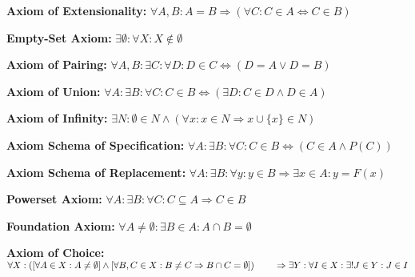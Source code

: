 \begin{description}
	\item \textbf{Axiom of Extensionality:} \quad $\forall A, B: A = B \Rightarrow (\forall C: C \in A \Leftrightarrow C \in B)$
	\item \textbf{Empty-Set Axiom:} \quad $\exists \emptyset : \forall X: X \notin \emptyset$
	\item \textbf{Axiom of Pairing:} \quad $\forall A, B: \exists C: \forall D: D \in C \Leftrightarrow (D = A \lor D = B)$
	\item \textbf{Axiom of Union:} \quad $\forall A: \exists B: \forall C: C \in B \Leftrightarrow (\exists D: C \in D \land D \in A)$
	\item \textbf{Axiom of Infinity:} \quad $\exists N: \emptyset \in N \land (\forall x: x \in N \Rightarrow x \cup \{x\} \in N)$
	\item \textbf{Axiom Schema of Specification:} \quad $\forall A: \exists B: \forall C: C \in B \Leftrightarrow (C \in A \land P(C))$
	\item \textbf{Axiom Schema of Replacement:} \quad $\forall A: \exists B: \forall y: y \in B \Rightarrow \exists x \in A: y = F(x)$
	\item \textbf{Powerset Axiom:} \quad $\forall A: \exists B: \forall C: C \subseteq A \Rightarrow C \in B$
	\item \textbf{Foundation Axiom:} \quad $\forall A \ne \emptyset: \exists B \in A: A \cap B = \emptyset$
	\item \textbf{Axiom of Choice:} \quad $\forall X:
		      \left( \left[ \forall A \in X: A \ne \emptyset \right] \land
		      \left[ \forall B, C \in X: B \ne C \Rightarrow B \cap C = \emptyset \right] \right) \\
		      \qquad \Rightarrow \exists Y: \forall I \in X: \exists! J \in Y: J \in I$
\end{description}

